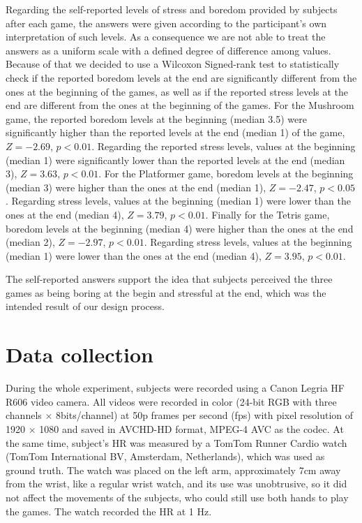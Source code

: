 Regarding the self-reported levels of stress and boredom provided by subjects after each game, the answers were given according to the participant's own interpretation of such levels. As a consequence we are not able to treat the answers as a uniform scale with a defined degree of difference among values. Because of that we decided to use a Wilcoxon Signed-rank test to statistically check if the reported boredom levels at the end are significantly different from the ones at the beginning of the games, as well as if the reported stress levels at the end are different from the ones at the beginning of the games. For the Mushroom game, the reported boredom levels at the beginning (median 3.5) were significantly higher than the reported levels at the end (median 1) of the game, $Z=-2.69$, $p<0.01$. Regarding the reported stress levels, values at the beginning (median 1) were significantly lower than the reported levels at the end (median 3), $Z=3.63$, $p<0.01$. For the Platformer game, boredom levels at the beginning (median 3) were higher than the ones at the end (median 1), $Z=-2.47$, $p<0.05$. Regarding stress levels, values at the beginning (median 1) were lower than the ones at the end (median 4), $Z=3.79$, $p<0.01$. Finally for the Tetris game, boredom levels at the beginning (median 4) were higher than the ones at the end (median 2), $Z=-2.97$, $p<0.01$. Regarding stress levels, values at the beginning (median 1) were lower than the ones at the end (median 4), $Z=3.95$, $p<0.01$.

The self-reported answers support the idea that subjects perceived the three games as being boring at the begin and stressful at the end, which was the intended result of our design process.

\section{Data collection}

During the whole experiment, subjects were recorded using a Canon Legria HF R606 video camera. All videos were recorded in color (24-bit RGB with three channels $\times$ 8bits/channel) at 50p frames per second (fps) with pixel resolution of 1920 $\times$ 1080 and saved in AVCHD-HD format, MPEG-4 AVC as the codec. At the same time, subject's HR was measured by a TomTom Runner Cardio watch (TomTom International BV, Amsterdam, Netherlands), which was used as ground truth. The watch was placed on the left arm, approximately 7cm away from the wrist, like a regular wrist watch, and its use was unobtrusive, so it did not affect the movements of the subjects, who could still use both hands to play the games. The watch recorded the HR at 1 Hz.

